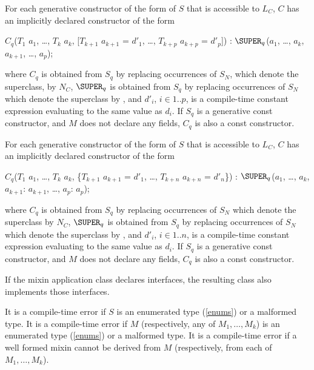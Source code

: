 \documentclass{article}
\begin{document}
\LMHash{}
For each generative constructor of the form  of $S$ that is accessible to $L_C$, $C$ has an implicitly declared constructor of the form
\begin{dartCode}
$C_q$($T_{1}$ $a_{1}$, \ldots , $T_{k}$ $a_{k}$, [$T_{k+1}$ $a_{k+1}$ = $d'_{1}$, \ldots , $T_{k+p}$ $a_{k+p}$ = $d'_p$])
    : $\SUPER_q$($a_{1}$, \ldots , $a_{k}$, $a_{k+1}$, \ldots, $a_p$);
\end{dartCode}

\noindent
where $C_q$ is obtained from $S_q$ by replacing occurrences of $S_N$,
which denote the superclass, by $N_C$,
$\SUPER_q$ is obtained from $S_q$ by replacing occurrences of $S_N$
which denote the superclass by \SUPER{},
and $d'_i$, $i \in 1..p$, is a compile-time constant expression evaluating
to the same value as $d_i$.
If $S_q$ is a generative const constructor, and $M$ does not declare any
fields, $C_q$ is also a const constructor.

\LMHash{}
For each generative constructor of the form  of $S$ that is accessible to $L_C$, $C$ has an implicitly declared constructor of the form
\begin{dartCode}
$C_q$($T_{1}$ $a_{1}$, \ldots , $T_{k}$ $a_{k}$, \{$T_{k+1}$ $a_{k+1}$ = $d'_1$, \ldots , $T_{k+n}$ $a_{k+n}$ = $d'_n$\})
    : $\SUPER_q$($a_{1}$, \ldots , $a_{k}$, $a_{k+1}$: $a_{k+1}$, \ldots, $a_p$: $a_p$);
\end{dartCode}

\noindent
where $C_q$ is obtained from $S_q$ by replacing occurrences of $S_N$
which denote the superclass by $N_C$,
$\SUPER_q$ is obtained from $S_q$ by replacing occurrences of $S_N$
which denote the superclass by \SUPER{},
and $d'_i$, $i \in 1..n$, is a compile-time constant expression evaluating to the same value as $d_i$.
If $S_q$ is a generative const constructor, and $M$ does not declare any
fields, $C_q$ is also a const constructor.

\LMHash{}
If the mixin application class declares interfaces, the resulting class also implements those interfaces.

\LMHash{}
It is a compile-time error if $S$ is an enumerated type (\ref{enums}) or a malformed type.
It is a compile-time error if $M$ (respectively, any of $M_1, \ldots, M_k$) is an enumerated type (\ref{enums}) or a malformed type.
It is a compile-time error if a well formed mixin cannot be derived from $M$ (respectively, from each of $M_1, \ldots, M_k$).
\end{document}
